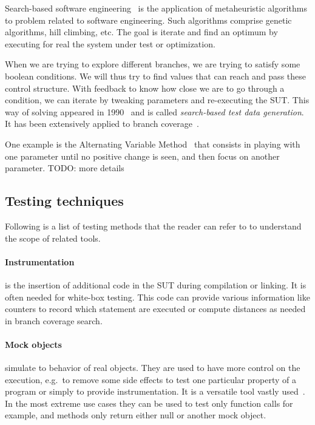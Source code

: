 \documentclass{llncs2e/llncs}
\makeatletter
\def\todo#1{{\color{red}TODO\@: #1}}
\makeatother
\begin{document}
Search-based software engineering~\cite{harman2001search} is the application of
metaheuristic algorithms to problem related to software engineering. Such
algorithms comprise genetic algorithms, hill climbing, etc. The goal is iterate
and find an optimum by executing for real the system under test or optimization.

When we are trying to explore different branches, we are trying to satisfy some
boolean conditions. We will thus try to find values that can reach and pass
these control structure. With feedback to know how close we are to go through a
condition, we can iterate by tweaking parameters and re-executing the SUT\@.
This way of solving appeared in 1990~\cite{korel1990automated} and is called
\textit{search-based test data generation}. It has been extensively applied to
branch
coverage~\cite{mcminn2004search,lakhotia2007multi,mcminn2007iguana,Kim2017ts}.

One example is the Alternating Variable Method~\cite{mcminn2016avmf} that
consists in playing with one parameter until no positive change is seen, and
then focus on another parameter. \todo{more details}


\subsection{Testing techniques} %
\label{techniques}

Following is a list of testing methods that the reader can refer to to
understand the scope of related tools.

\paragraph{Instrumentation} is the insertion of additional code in the SUT
during compilation or linking. It is often needed for white-box testing. This
code can provide various information like counters to record which statement are
executed or compute distances as needed in branch coverage search.

\paragraph{Mock objects} simulate to behavior of real objects. They are used to
have more control on the execution, e.g.\ to remove some side effects to test
one particular property of a program or simply to provide instrumentation. It is
a versatile tool vastly
used~\cite{mackinnon2000endo,taneja2010moda,freeman2004mock,tillmann2006mock}.
In the most extreme use cases they can be used to test only function calls for
example, and methods only return either null or another mock object.
\end{document}

